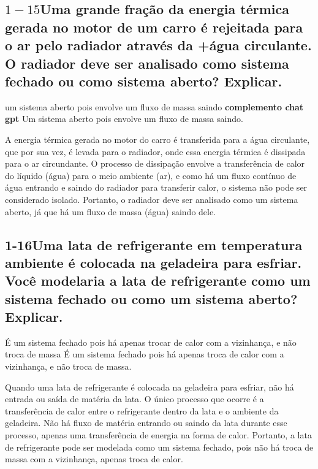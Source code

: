 \documentclass{article}
\begin{document}
\subsection*{$1-15$Uma grande fração da energia térmica gerada no motor de um carro é rejeitada para o ar pelo radiador através da +água circulante. O radiador deve ser analisado como sistema fechado ou como sistema aberto? Explicar.}

um sistema aberto pois envolve um fluxo de massa saindo 
\textbf{complemento chat gpt}
Um sistema aberto pois envolve um fluxo de massa saindo.

A energia térmica gerada no motor do carro é transferida para a água circulante, que por sua vez, é levada para o radiador, onde essa energia térmica é dissipada para o ar circundante. O processo de dissipação envolve a transferência de calor do líquido (água) para o meio ambiente (ar), e como há um fluxo contínuo de água entrando e saindo do radiador para transferir calor, o sistema não pode ser considerado isolado. Portanto, o radiador deve ser analisado como um sistema aberto, já que há um fluxo de massa (água) saindo dele.
\subsection*{1-16Uma lata de refrigerante em temperatura ambiente é colocada na geladeira para esfriar. Você modelaria a lata de refrigerante como um sistema fechado ou como um sistema aberto? Explicar.} É um sistema fechado pois há apenas trocar de calor com a vizinhança, e não troca de massa 
É um sistema fechado pois há apenas troca de calor com a vizinhança, e não troca de massa.

Quando uma lata de refrigerante é colocada na geladeira para esfriar, não há entrada ou saída de matéria da lata. O único processo que ocorre é a transferência de calor entre o refrigerante dentro da lata e o ambiente da geladeira. Não há fluxo de matéria entrando ou saindo da lata durante esse processo, apenas uma transferência de energia na forma de calor. Portanto, a lata de refrigerante pode ser modelada como um sistema fechado, pois não há troca de massa com a vizinhança, apenas troca de calor.
\end{document}
